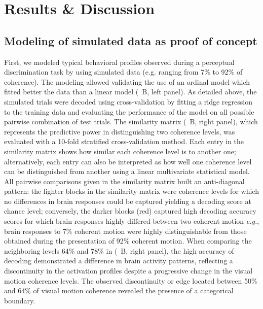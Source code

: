 \section{Results \& Discussion}
\subsection*{Modeling of simulated data as proof of concept}

First, we modeled typical behavioral profiles observed during a perceptual discrimination task by using simulated data (e.g. ranging from 7\% to 92\% of coherence). The modeling allowed validating the use of an ordinal model which fitted better the data than a linear model (~B, left panel). As detailed above, the simulated trials were decoded using cross-validation by fitting a ridge regression to the training data and evaluating the performance of the model on all possible pairwise combination of test trials.
The similarity matrix (~B, right panel), which represents the predictive power in distinguishing two coherence levels, was evaluated with a 10-fold stratified cross-validation method. Each entry in the similarity matrix shows how similar each coherence level is to another one; alternatively, each entry can also be interpreted as how well one coherence level can be distinguished from another using a linear multivariate statistical model. All pairwise comparisons given in the similarity matrix built an anti-diagonal pattern: the lighter blocks in the similarity matrix were coherence levels for which no differences in brain responses could be captured yielding a decoding score at chance level; conversely, the darker blocks (red) captured high decoding accuracy scores for which brain responses highly differed between two coherent motion \textit{e.g.}, brain responses to 7\% coherent motion were highly distinguishable from those obtained during the presentation of 92\% coherent motion. When comparing the neighboring levels 64\% and 78\% in (~B, right panel), the high accuracy of decoding demonstrated a difference in brain activity patterns, reflecting a discontinuity in the activation profiles despite a progressive change in the visual motion coherence levels. The observed discontinuity or edge located between 50\% and 64\% of visual motion coherence revealed the presence of a categorical boundary.\\

